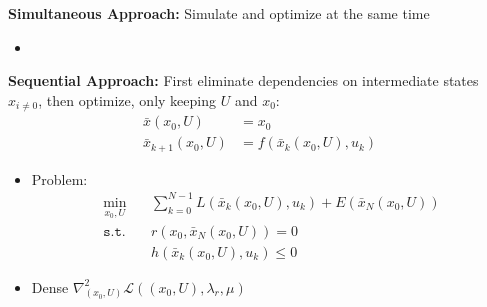 
\begin{tcolorbox}[colback=red!5!white,%
  colframe=red!75!black,%
  title=\textbf{Discrete Optimization}]
  \textbf{Simultaneous Approach:} Simulate and optimize at the same time
  \begin{itemize}
  \item 
  \end{itemize}
  
  \textbf{Sequential Approach:} First eliminate dependencies on intermediate
  states $x_{i\ne 0}$, then optimize, only keeping $U$ and $x_0$:
  \begin{align*}
    \bar{x}(x_0, U) &= x_0 \\
    \bar{x}_{k+1}(x_0, U)& =f(\bar{x}_k(x_0, U), u_k)
  \end{align*}
  \begin{itemize}
  \item Problem:
    \begin{align*}
      \min_{x_0, U}&\sum^{N-1}_{k=0} L(\bar{x}_k(x_0, U), u_k) + E(\bar{x}_N(x_0, U)) \\
      \mathtt{s.t.}\quad & r(x_0, \bar{x}_N(x_0, U)) = 0 \\
                   & h(\bar{x}_k(x_0, U), u_k) \le 0
    \end{align*}
  \item Dense $\nabla^2_{(x_0,U)} \mathcal{L}((x_0,U), \lambda_r, \mu)$
  \end{itemize}

\end{tcolorbox}
